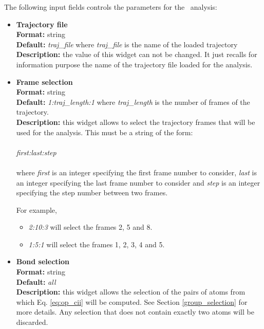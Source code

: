 \documentclass[a4paper,11pt]{report}
\begin{document}
The following input fields controls the parameters for the \OP\ analysis:

\hypertarget{op_trajectory_file}{}
\begin{itemize}
\item \textbf{Trajectory file}\\
\textbf{Format:} string\\
\textbf{Default:} \textit{traj\_file} where \textit{traj\_file} is the name of the loaded trajectory\\
\textbf{Description:} the value of this widget can not be changed. It just recalls for information purpose the name
of the trajectory file loaded for the analysis.

\hypertarget{op_frame_selection}{}
\item \textbf{Frame selection}\\
\textbf{Format:} string\\
\textbf{Default:} \textit{1:traj\_length:1} where \textit{traj\_length} is the number of frames of the trajectory.\\
\textbf{Description:} this widget allows to select the trajectory frames that will be used for the analysis. This must
be a string of the form:
\\\\
\textit{first:last:step}
\\\\
where \textit{first} is an integer specifying the first frame number to consider, \textit{last} is an integer specifying the last 
frame number to consider and \textit{step} is an integer specifying the step number between two frames.

For example,
\begin{itemize}
\item \textit{2:10:3} will select the frames 2, 5 and 8.
\item \textit{1:5:1} will select the frames 1, 2, 3, 4 and 5.
\end{itemize}

\hypertarget{op_bond_selection}{}
\item \textbf{Bond selection}\\
\textbf{Format:} string\\
\textbf{Default:} \textit{all}\\
\textbf{Description:} this widget allows the selection of the pairs of atoms from which Eq. \ref{eq:op_cii} will 
be computed. See Section \ref{group_selection} for more details. Any selection that does not contain exactly two atoms will be discarded.


\end{itemize}
\end{document}
